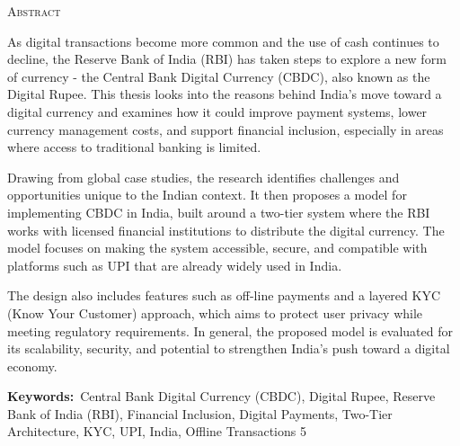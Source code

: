  \cleardoublepage
 \setcounter{page}{5}
 \begin{center}
 {\LARGE \textsc{Abstract}}
 \end{center}
 \vspace{1cm}
 
As digital transactions become more common and the use of cash continues to decline, the Reserve Bank of India (RBI) has taken steps to explore a new form of currency - the Central Bank Digital Currency (CBDC), also known as the Digital Rupee. This thesis looks into the reasons behind India's move toward a digital currency and examines how it could improve payment systems, lower currency management costs, and support financial inclusion, especially in areas where access to traditional banking is limited.

Drawing from global case studies, the research identifies challenges and opportunities unique to the Indian context. It then proposes a model for implementing CBDC in India, built around a two-tier system where the RBI works with licensed financial institutions to distribute the digital currency. The model focuses on making the system accessible, secure, and compatible with platforms such as UPI that are already widely used in India.

The design also includes features such as off-line payments and a layered KYC (Know Your Customer) approach, which aims to protect user privacy while meeting regulatory requirements. In general, the proposed model is evaluated for its scalability, security, and potential to strengthen India’s push toward a digital economy.\\
 \vspace{0.5cm} 
 
 \noindent \textbf{Keywords:}~Central Bank Digital Currency (CBDC), Digital Rupee, Reserve Bank of India (RBI), Financial Inclusion, Digital Payments, Two-Tier Architecture, KYC, UPI, India, Offline Transactions
5
